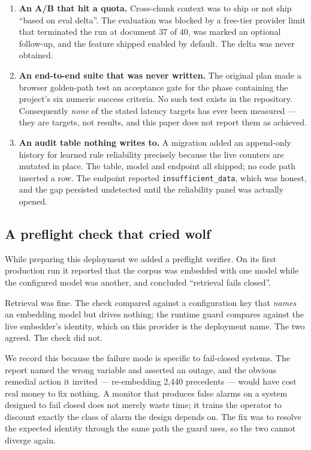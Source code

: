 \documentclass[10pt]{article}
\newcommand{\code}[1]{\texttt{\small #1}}
\begin{document}
\begin{enumerate}
  \item \textbf{An A/B that hit a quota.} Cross-chunk context was to ship or
        not ship ``based on eval delta''. The evaluation was blocked by a
        free-tier provider limit that terminated the run at document 37 of 40,
        was marked an optional follow-up, and the feature shipped enabled by
        default. The delta was never obtained.
  \item \textbf{An end-to-end suite that was never written.} The original plan
        made a browser golden-path test an acceptance gate for the phase
        containing the project's six numeric success criteria. No such test
        exists in the repository. Consequently \emph{none} of the stated
        latency targets has ever been measured --- they are targets, not
        results, and this paper does not report them as achieved.
  \item \textbf{An audit table nothing writes to.} A migration added an
        append-only history for learned rule reliability precisely because the
        live counters are mutated in place. The table, model and endpoint all
        shipped; no code path inserted a row. The endpoint reported
        \code{insufficient\_data}, which was honest, and the gap persisted
        undetected until the reliability panel was actually opened.
\end{enumerate}

\subsection{A preflight check that cried wolf}

While preparing this deployment we added a preflight verifier. On its first
production run it reported that the corpus was embedded with one model while
the configured model was another, and concluded ``retrieval fails closed''.

Retrieval was fine. The check compared against a configuration key that
\emph{names} an embedding model but drives nothing; the runtime guard compares
against the live embedder's identity, which on this provider is the deployment
name. The two agreed. The check did not.

We record this because the failure mode is specific to fail-closed systems. The
report named the wrong variable and asserted an outage, and the obvious
remedial action it invited --- re-embedding 2{,}440 precedents --- would have
cost real money to fix nothing. A monitor that produces false alarms on a
system designed to fail closed does not merely waste time; it trains the
operator to discount exactly the class of alarm the design depends on. The fix
was to resolve the expected identity through the same path the guard uses, so
the two cannot diverge again.
\end{document}
